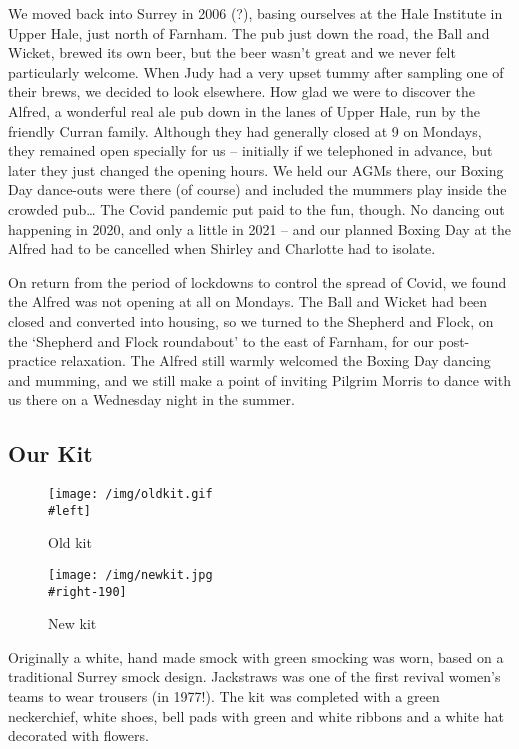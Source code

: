 \documentclass[
]{article}
\begin{document}
We moved back into Surrey in 2006 (?), basing ourselves at the Hale
Institute in Upper Hale, just north of Farnham. The pub just down the
road, the Ball and Wicket, brewed its own beer, but the beer wasn't
great and we never felt particularly welcome. When Judy had a very upset
tummy after sampling one of their brews, we decided to look elsewhere.
How glad we were to discover the Alfred, a wonderful real ale pub down
in the lanes of Upper Hale, run by the friendly Curran family. Although
they had generally closed at 9 on Mondays, they remained open specially
for us -- initially if we telephoned in advance, but later they just
changed the opening hours. We held our AGMs there, our Boxing Day
dance-outs were there (of course) and included the mummers play inside
the crowded pub\ldots{} The Covid pandemic put paid to the fun, though.
No dancing out happening in 2020, and only a little in 2021 -- and our
planned Boxing Day at the Alfred had to be cancelled when Shirley and
Charlotte had to isolate.

On return from the period of lockdowns to control the spread of Covid,
we found the Alfred was not opening at all on Mondays. The Ball and
Wicket had been closed and converted into housing, so we turned to the
Shepherd and Flock, on the `Shepherd and Flock roundabout' to the east
of Farnham, for our post-practice relaxation. The Alfred still warmly
welcomed the Boxing Day dancing and mumming, and we still make a point
of inviting Pilgrim Morris to dance with us there on a Wednesday night
in the summer.

\hypertarget{our-kit}{%
\subsection{Our Kit}\label{our-kit}}

\begin{figure}
\centering
\texttt{[image: /img/oldkit.gif\\\#left]}
\caption{Old kit}
\end{figure}

\begin{figure}
\centering
\texttt{[image: /img/newkit.jpg\\\#right-190]}
\caption{New kit}
\end{figure}

Originally a white, hand made smock with green smocking was worn, based
on a traditional Surrey smock design. Jackstraws was one of the first
revival women's teams to wear trousers (in 1977!). The kit was completed
with a green neckerchief, white shoes, bell pads with green and white
ribbons and a white hat decorated with flowers.
\end{document}
